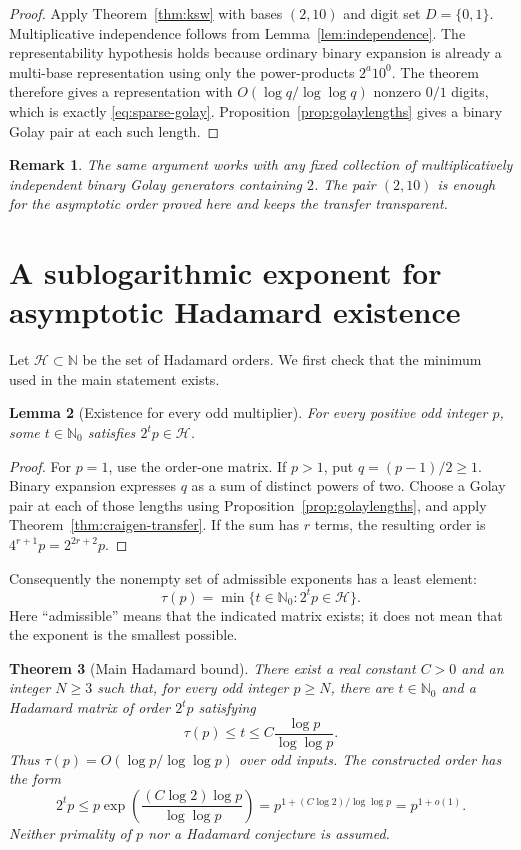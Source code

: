 \documentclass[11pt]{article}
\newtheorem{theorem}{Theorem}[section]
\newtheorem{lemma}[theorem]{Lemma}
\newtheorem{remark}[theorem]{Remark}
\newcommand{\Hcal}{\mathcal{H}}
\newcommand{\N}{\mathbb{N}}
\begin{document}
\begin{proof}
Apply Theorem~\ref{thm:ksw} with bases $(2,10)$ and digit set $D=\{0,1\}$.  Multiplicative independence follows from Lemma~\ref{lem:independence}.  The representability hypothesis holds because ordinary binary expansion is already a multi-base representation using only the power-products $2^a10^0$.  The theorem therefore gives a representation with $O(\log q/\log\log q)$ nonzero $0/1$ digits, which is exactly \eqref{eq:sparse-golay}.  Proposition~\ref{prop:golaylengths} gives a binary Golay pair at each such length.
\end{proof}

\begin{remark}\label{rem:morebases}
The same argument works with any fixed collection of multiplicatively independent binary Golay generators containing $2$.  The pair $(2,10)$ is enough for the asymptotic order proved here and keeps the transfer transparent.
\end{remark}

\section{A sublogarithmic exponent for asymptotic Hadamard existence}
Let $\Hcal\subset\N$ be the set of Hadamard orders. We first check that
the minimum used in the main statement exists.

\begin{lemma}[Existence for every odd multiplier]\label{lem:existence}
For every positive odd integer $p$, some $t\in\N_0$ satisfies $2^tp\in\Hcal$.
\end{lemma}
\begin{proof}
For $p=1$, use the order-one matrix. If $p>1$, put $q=(p-1)/2\ge1$.
Binary expansion expresses $q$ as a sum of distinct powers of two.
Choose a Golay pair at each of those lengths using
Proposition~\ref{prop:golaylengths}, and apply
Theorem~\ref{thm:craigen-transfer}. If the sum has $r$ terms, the resulting
order is $4^{r+1}p=2^{2r+2}p$.
\end{proof}

Consequently the nonempty set of admissible exponents has a least element:
\[
\tau(p)=\min\{t\in\N_0:2^tp\in\Hcal\}.
\]
Here ``admissible'' means that the indicated matrix exists; it does not mean
that the exponent is the smallest possible.

\begin{theorem}[Main Hadamard bound]\label{thm:main}
There exist a real constant $C>0$ and an integer $N\ge3$ such that, for every
odd integer $p\ge N$, there are $t\in\N_0$ and a Hadamard matrix of order
$2^tp$ satisfying
\begin{equation}\label{eq:main}
\tau(p)\le t\le C\frac{\log p}{\log\log p}.
\end{equation}
Thus $\tau(p)=O(\log p/\log\log p)$ over odd inputs. The constructed order
has the form
\[
2^tp\le p\exp\!\left(\frac{(C\log2)\log p}{\log\log p}\right)
=p^{1+(C\log2)/\log\log p}=p^{1+o(1)}.
\]
Neither primality of $p$ nor a Hadamard conjecture is assumed.
\end{theorem}
\end{document}

